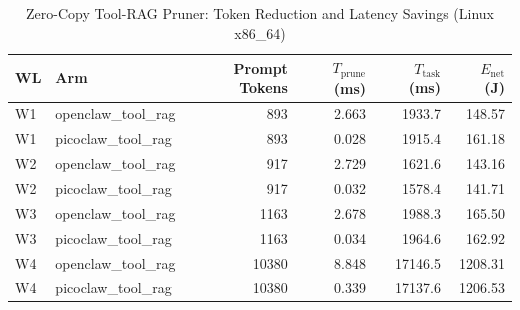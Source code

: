 \begin{table}[t]
\centering\small
\caption{Zero-Copy Tool-RAG Pruner: Token Reduction and Latency Savings (Linux x86_64)}
\label{tab:linux_tool_rag}
\begin{tabular}{llrrrr}
\toprule
WL & Arm & Prompt Tokens & $T_{\text{prune}}$ (ms) & $T_{\text{task}}$ (ms) & $E_{\text{net}}$ (J) \\
\midrule
W1 & openclaw\_tool\_rag & 893 & 2.663 & 1933.7 & 148.57 \\
W1 & picoclaw\_tool\_rag & 893 & 0.028 & 1915.4 & 161.18 \\
W2 & openclaw\_tool\_rag & 917 & 2.729 & 1621.6 & 143.16 \\
W2 & picoclaw\_tool\_rag & 917 & 0.032 & 1578.4 & 141.71 \\
W3 & openclaw\_tool\_rag & 1163 & 2.678 & 1988.3 & 165.50 \\
W3 & picoclaw\_tool\_rag & 1163 & 0.034 & 1964.6 & 162.92 \\
W4 & openclaw\_tool\_rag & 10380 & 8.848 & 17146.5 & 1208.31 \\
W4 & picoclaw\_tool\_rag & 10380 & 0.339 & 17137.6 & 1206.53 \\
\bottomrule
\end{tabular}
\end{table}
